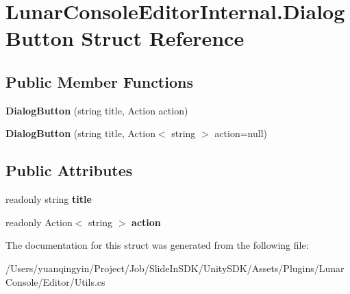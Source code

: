 \hypertarget{struct_lunar_console_editor_internal_1_1_dialog_button}{}\section{Lunar\+Console\+Editor\+Internal.\+Dialog\+Button Struct Reference}
\label{struct_lunar_console_editor_internal_1_1_dialog_button}
\subsection*{Public Member Functions}
\begin{DoxyCompactItemize}
\item 
\mbox{\label{struct_lunar_console_editor_internal_1_1_dialog_button_aae4a6c83a9e42747e3770e931ee59fbe}} 
{\bfseries Dialog\+Button} (string title, Action action)
\item 
\mbox{\label{struct_lunar_console_editor_internal_1_1_dialog_button_a722d6ee405569bade2eba5579248749b}} 
{\bfseries Dialog\+Button} (string title, Action$<$ string $>$ action=null)
\end{DoxyCompactItemize}
\subsection*{Public Attributes}
\begin{DoxyCompactItemize}
\item 
\mbox{\label{struct_lunar_console_editor_internal_1_1_dialog_button_a0fd48e37af7d08eca3016e3a62b9c9a5}} 
readonly string {\bfseries title}
\item 
\mbox{\label{struct_lunar_console_editor_internal_1_1_dialog_button_a39cae110a97cf41f0657679e20864c61}} 
readonly Action$<$ string $>$ {\bfseries action}
\end{DoxyCompactItemize}


The documentation for this struct was generated from the following file\+:\begin{DoxyCompactItemize}
\item 
/\+Users/yuanqingyin/\+Project/\+Job/\+Slide\+In\+S\+D\+K/\+Unity\+S\+D\+K/\+Assets/\+Plugins/\+Lunar\+Console/\+Editor/Utils.\+cs\end{DoxyCompactItemize}
